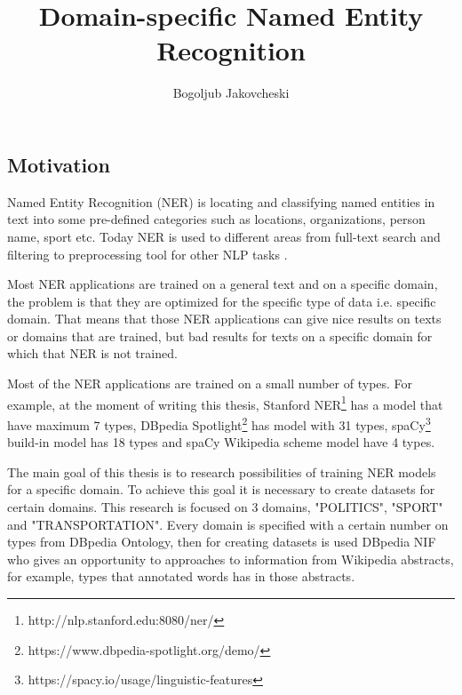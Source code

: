 \documentclass[thesis=M,english]{FITthesis}[2018/05/30]
\title{Domain-specific Named Entity Recognition}
\author{Bogoljub Jakovcheski} %
\begin{document}

\begin{introduction}

\section{Motivation}
    Named Entity Recognition (NER)\cite{wiki:NER} is locating and classifying named entities in text into some pre-defined categories such as locations, organizations, person name, sport etc. Today NER is used to different areas from full-text search and filtering to preprocessing tool for other NLP tasks \cite{master:NER}.  	
		
    Most NER applications are trained on a general text and on a specific domain, the problem is that they are optimized for the specific type of data i.e. specific domain. That means that those NER applications can give nice results on texts or domains that are trained, but bad results for texts on a specific domain for which that NER is not trained.
	  
    Most of the NER applications are trained on a small number of types. For example, at the moment of writing this thesis, Stanford NER\footnote{http://nlp.stanford.edu:8080/ner/} has a model that have maximum 7 types, DBpedia Spotlight\footnote{https://www.dbpedia-spotlight.org/demo/} has model with 31 types, spaCy\footnote{https://spacy.io/usage/linguistic-features} build-in model has 18 types and spaCy Wikipedia scheme model have 4 types.
	  
	The main goal of this thesis is to research possibilities of training NER models for a specific domain. To achieve this goal it is necessary to create datasets for certain domains. This research is focused on 3 domains, "POLITICS", "SPORT" and "TRANSPORTATION". Every domain is specified with a certain number on types from DBpedia Ontology, then for creating datasets is used DBpedia NIF who gives an opportunity to approaches to information from Wikipedia abstracts, for example, types that annotated words has in those abstracts.
	  
	  
	  

\end{introduction}
\end{document}
